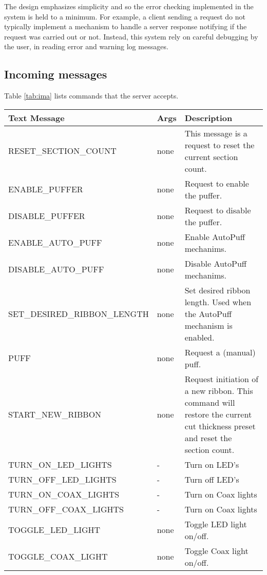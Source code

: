 \documentclass[11pt,fleqn]{book} %
\begin{document}
The design emphasizes simplicity and so the error checking implemented in the system is held to a minimum. For example, a client sending a request do not typically implement a mechanism to handle a server response notifying if the request was carried out or not.
Instead, this system rely on careful debugging by the user, in reading error and warning log messages.


\subsection{Incoming messages}

Table \ref{tab:ima} lists commands that the \ar{} server accepts.
\begin{table}[h]
\centering
\begin{tabular}{l l  p{180pt}}
\toprule
\textbf{Text Message} & \textbf{Args} & \textbf{Description} \\
\midrule
RESET\_SECTION\_COUNT 	        & none & This message is a request to reset the current section count. \\
ENABLE\_PUFFER                  & none & Request to enable the puffer. \\  
DISABLE\_PUFFER                 & none & Request to disable the puffer. \\  
ENABLE\_AUTO\_PUFF              & none & Enable AutoPuff mechanims. \\  
DISABLE\_AUTO\_PUFF             & none & Disable AutoPuff mechanims. \\  
SET\_DESIRED\_RIBBON\_LENGTH    & none & Set desired ribbon length. Used when the AutoPuff mechanism is enabled. \\  
PUFF                            & none & Request a (manual) puff. \\  
START\_NEW\_RIBBON              & none & Request initiation of a new ribbon. This command will restore the current cut thickness preset and reset the section count. \\  
TURN\_ON\_LED\_LIGHTS				& -		& Turn on LED's \\
TURN\_OFF\_LED\_LIGHTS				& -		& Turn off LED's \\
TURN\_ON\_COAX\_LIGHTS				& -		& Turn on Coax lights \\
TURN\_OFF\_COAX\_LIGHTS			& -		& Turn on Coax lights \\
TOGGLE\_LED\_LIGHT              & none & Toggle LED light on/off. \\  
TOGGLE\_COAX\_LIGHT             & none & Toggle Coax light on/off. \\  


\end{tabular}
\end{table}
\end{document}
